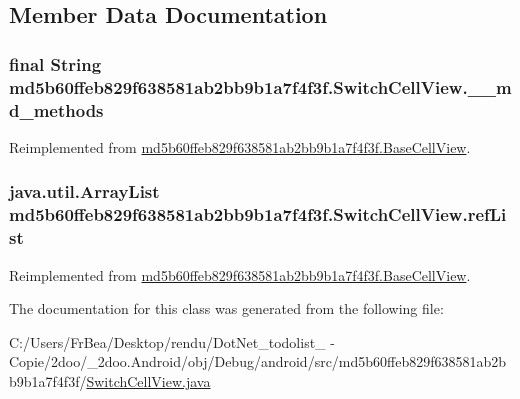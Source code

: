 \subsection{Member Data Documentation}
\hypertarget{classmd5b60ffeb829f638581ab2bb9b1a7f4f3f_1_1_switch_cell_view_1153176f1114dedfcdc6c831e33adfea}{
\subsubsection[{\_\-\_\-md\_\-methods}]{\setlength{\rightskip}{0pt plus 5cm}final String {\bf md5b60ffeb829f638581ab2bb9b1a7f4f3f.SwitchCellView.\_\-\_\-md\_\-methods}}}
\label{classmd5b60ffeb829f638581ab2bb9b1a7f4f3f_1_1_switch_cell_view_1153176f1114dedfcdc6c831e33adfea}




Reimplemented from \hyperlink{classmd5b60ffeb829f638581ab2bb9b1a7f4f3f_1_1_base_cell_view_b45ff8d3fd40dd0e56aafff804b441ea}{md5b60ffeb829f638581ab2bb9b1a7f4f3f.BaseCellView}.\hypertarget{classmd5b60ffeb829f638581ab2bb9b1a7f4f3f_1_1_switch_cell_view_66bff703a87b9110a0b7ec44c8abfffb}{
\subsubsection[{refList}]{\setlength{\rightskip}{0pt plus 5cm}java.util.ArrayList {\bf md5b60ffeb829f638581ab2bb9b1a7f4f3f.SwitchCellView.refList}}}
\label{classmd5b60ffeb829f638581ab2bb9b1a7f4f3f_1_1_switch_cell_view_66bff703a87b9110a0b7ec44c8abfffb}




Reimplemented from \hyperlink{classmd5b60ffeb829f638581ab2bb9b1a7f4f3f_1_1_base_cell_view_da428ae06aa11eb73b64b1723a81985b}{md5b60ffeb829f638581ab2bb9b1a7f4f3f.BaseCellView}.

The documentation for this class was generated from the following file:\begin{CompactItemize}
\item 
C:/Users/FrBea/Desktop/rendu/DotNet\_\-todolist\_ - Copie/2doo/\_\-2doo.Android/obj/Debug/android/src/md5b60ffeb829f638581ab2bb9b1a7f4f3f/\hyperlink{_switch_cell_view_8java}{SwitchCellView.java}\end{CompactItemize}

